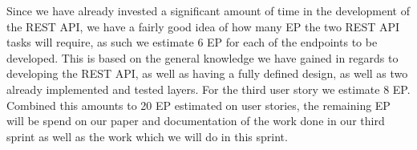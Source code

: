 \bigskip \noindent
Since we have already invested a significant amount of time in the development of the REST API, we have a fairly good idea of how many EP the two REST API tasks will require, as such we estimate 6 EP for each of the endpoints to be developed.
This is based on the general knowledge we have gained in regards to developing the REST API, as well as having a fully defined design, as well as two already implemented and tested layers.%
For the third user story we estimate 8 EP.
Combined this amounts to 20 EP estimated on user stories, the remaining EP will be spend on our paper and documentation of the work done in our third sprint as well as the work which we will do in this sprint.